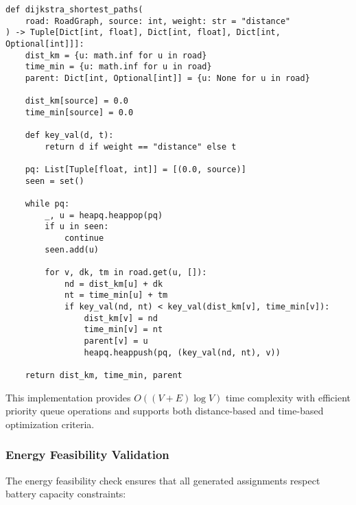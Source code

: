 \documentclass[12pt,a4paper]{article}
\begin{document}
\begin{lstlisting}[caption=Optimized Dijkstra Implementation]
def dijkstra_shortest_paths(
    road: RoadGraph, source: int, weight: str = "distance"
) -> Tuple[Dict[int, float], Dict[int, float], Dict[int, Optional[int]]]:
    dist_km = {u: math.inf for u in road}
    time_min = {u: math.inf for u in road}
    parent: Dict[int, Optional[int]] = {u: None for u in road}
    
    dist_km[source] = 0.0
    time_min[source] = 0.0
    
    def key_val(d, t):
        return d if weight == "distance" else t
    
    pq: List[Tuple[float, int]] = [(0.0, source)]
    seen = set()
    
    while pq:
        _, u = heapq.heappop(pq)
        if u in seen:
            continue
        seen.add(u)
        
        for v, dk, tm in road.get(u, []):
            nd = dist_km[u] + dk
            nt = time_min[u] + tm
            if key_val(nd, nt) < key_val(dist_km[v], time_min[v]):
                dist_km[v] = nd
                time_min[v] = nt
                parent[v] = u
                heapq.heappush(pq, (key_val(nd, nt), v))
    
    return dist_km, time_min, parent
\end{lstlisting}

This implementation provides $O((V + E) \log V)$ time complexity with efficient priority queue operations and supports both distance-based and time-based optimization criteria.

\subsubsection{Energy Feasibility Validation}

The energy feasibility check ensures that all generated assignments respect battery capacity constraints:
\end{document}
